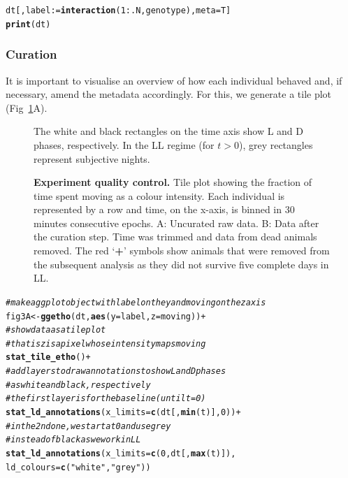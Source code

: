 \documentclass[10pt,letterpaper]{article}\usepackage[]{graphicx}\usepackage[]{color}
\makeatletter
\newcommand{\hlnum}[1]{\textcolor[rgb]{0.686,0.059,0.569}{#1}}%
\newcommand{\hlstr}[1]{\textcolor[rgb]{0.192,0.494,0.8}{#1}}%
\newcommand{\hlcom}[1]{\textcolor[rgb]{0.678,0.584,0.686}{\textit{#1}}}%
\newcommand{\hlopt}[1]{\textcolor[rgb]{0,0,0}{#1}}%
\newcommand{\hlstd}[1]{\textcolor[rgb]{0.345,0.345,0.345}{#1}}%
\newcommand{\hlkwb}[1]{\textcolor[rgb]{0.69,0.353,0.396}{#1}}%
\newcommand{\hlkwc}[1]{\textcolor[rgb]{0.333,0.667,0.333}{#1}}%
\newcommand{\hlkwd}[1]{\textcolor[rgb]{0.737,0.353,0.396}{\textbf{#1}}}%
\newenvironment{kframe}{%
 \def\at@end@of@kframe{}%
 \ifinner\ifhmode%
  \def\at@end@of@kframe{\end{minipage}}%
  \begin{minipage}{\columnwidth}%
 \fi\fi%
 \def\FrameCommand##1{\hskip\@totalleftmargin \hskip-\fboxsep
 \colorbox{shadecolor}{##1}\hskip-\fboxsep
     \hskip-\linewidth \hskip-\@totalleftmargin \hskip\columnwidth}%
 \MakeFramed {\advance\hsize-\width
   \@totalleftmargin\z@ \linewidth\hsize
   \@setminipage}}%
 {\par\unskip\endMakeFramed%
 \at@end@of@kframe}
\newenvironment{knitrout}{}{} %
\makeatother
\begin{document}
\begin{knitrout}
\color{fgcolor}\begin{kframe}
\begin{alltt}
\hlstd{dt[, label} \hlkwb{:=} \hlkwd{interaction}\hlstd{(}\hlnum{1}\hlopt{:}\hlstd{.N, genotype),} \hlkwc{meta} \hlstd{= T]}
\hlkwd{print}\hlstd{(dt)}
\end{alltt}
\end{kframe}
\end{knitrout}


\subsubsection*{Curation}
It is important to visualise an overview of how each individual behaved and, if necessary, amend the metadata accordingly.
For this, we generate a tile plot (Fig~\ref{fig:fig-3}A).

\begin{figure}[!h]
	\caption{{\bf Experiment quality control.}
			Tile plot showing the fraction of time spent moving as a colour intensity.
			Each individual is represented by a row and time, on the x-axis, is binned in 30 minutes consecutive epochs.
			A: Uncurated raw data.
			B: Data after the curation step. Time was trimmed and data from dead animals removed. 
			The red `\textbf{+}' symbols show animals that were removed from the subsequent analysis as they did not survive five complete days in LL.}
			The white and black rectangles on the time axis show L and D phases, respectively.
			In the LL regime (for $t > 0$), grey rectangles represent subjective nights.
			
	\label{fig:fig-3}
\end{figure}

\begin{knitrout}
\color{fgcolor}\begin{kframe}
\begin{alltt}
\hlcom{# make a ggplot object with label on the y and moving on the z axis}
\hlstd{fig3A} \hlkwb{<-} \hlkwd{ggetho}\hlstd{(dt,} \hlkwd{aes}\hlstd{(}\hlkwc{y} \hlstd{= label,} \hlkwc{z} \hlstd{= moving))} \hlopt{+}
  \hlcom{# show data as a tile plot}
  \hlcom{# that is z is a pixel whose intensity maps moving}
  \hlkwd{stat_tile_etho}\hlstd{()} \hlopt{+}
  \hlcom{# add layers to draw annotations to show L and D phases}
  \hlcom{# as white and black, respectively}
  \hlcom{# the first layer is for the baseline (until t = 0)}
  \hlkwd{stat_ld_annotations}\hlstd{(}\hlkwc{x_limits} \hlstd{=} \hlkwd{c}\hlstd{(dt[,}\hlkwd{min}\hlstd{(t)],} \hlnum{0}\hlstd{))} \hlopt{+}
  \hlcom{# in the 2nd one, we start at 0 and use grey }
  \hlcom{# instead of black as we work in LL}
  \hlkwd{stat_ld_annotations}\hlstd{(}\hlkwc{x_limits} \hlstd{=} \hlkwd{c}\hlstd{(}\hlnum{0}\hlstd{, dt[,} \hlkwd{max}\hlstd{(t)]),}
                      \hlkwc{ld_colours} \hlstd{=} \hlkwd{c}\hlstd{(}\hlstr{"white"}\hlstd{,} \hlstr{"grey"}\hlstd{))}
\end{alltt}
\end{kframe}
\end{knitrout}
\end{document}
